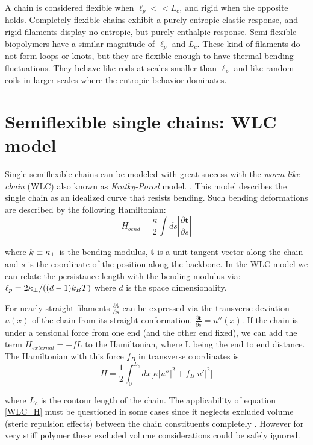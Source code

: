 A chain is considered flexible when $\ell_p<<L_c$, and rigid when the opposite
holds. Completely flexible chains exhibit a purely entropic elastic
response, and rigid filaments display no entropic, but purely enthalpic
response. Semi-flexible biopolymers have a similar magnitude of $\ell_p$ and
$L_c$. These kind of filaments do not form loops or knots, but they are
flexible enough to have thermal bending
fluctuations\citep{storm_nonlinear_2005}. They behave like rods at scales
smaller than $\ell_p$ and like random coils in larger scales where the entropic behavior
dominates.

\section{Semiflexible single chains: WLC model}
Single semiflexible chains can be modeled with great success with the
\emph{worm-like chain} (WLC) also known as \emph{Kratky-Porod} model.
\citep{rubinstein_polymer_2003, schuster_hierarchical_2011}. This model
describes the single chain as an idealized curve that resists bending. Such
bending deformations are described by the following Hamiltonian:
$$H_{bend}=\frac{\kappa}{2} \int ds|\frac{\partial \textbf{t}}{\partial s}|$$

where $k\equiv\kappa_\perp{}$ is the bending modulus, \textbf{t} is a unit tangent
vector along the chain and $s$ is the coordinate of the position along the
backbone. In the WLC model we can relate the persistance length with the bending
modulus via: $\ell_p{}=2\kappa_\perp{}/((d-1)k_B{}T)$ where $d$ is the space
dimensionality.

For nearly straight filaments $\frac{\partial \textbf{t}}{\partial s}$ can be
expressed via the transverse deviation $u(x)$ of the chain from its straight
conformation. $\frac{\partial \textbf{t}}{\partial s}=u''(x)$. If the chain is
under a tensional force from one end (and the other end fixed), we can add the
term $H_{external}=-fL$ to the Hamiltonian, where L being the end to end
distance.
The Hamiltonian with this force $f_B$ in transverse coordinates is
\begin{equation}\label{WLC_H}
H=\frac{1}{2}\int_0^{L_c} dx\Big[\kappa|u''|^2 + f_B|u'|^2\Big]
\end{equation}

where $L_c$ is the contour length of the chain.
The applicability of equation \ref{WLC_H} must be questioned in some cases since
it neglects excluded volume (steric repulsion effects) between the
chain constituents completely \citep{hsu_breakdown_2011}. However for very stiff
polymer these excluded volume considerations could be safely ignored.

